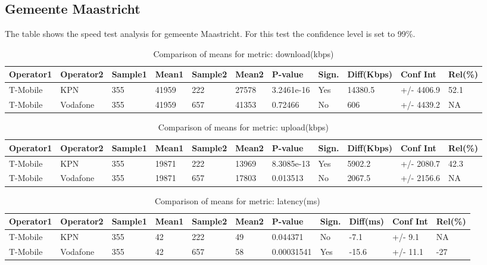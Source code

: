 \documentclass[]{article}
\begin{document}
\normalsize

\newpage

\subsection{Gemeente Maastricht}\label{gemeente-maastricht}

The table shows the speed test analysis for gemeente Maastricht. For
this test the confidence level is set to 99\%.

\begin{table}[ht]
\centering
{\footnotesize
\begin{tabular}{lllllllllll}
  \hline
Operator1 & Operator2 & Sample1 & Mean1 & Sample2 & Mean2 & P-value & Sign. & Diff(Kbps) & Conf Int & Rel(\%) \\ 
  \hline
T-Mobile & KPN & 355 & 41959 & 222 & 27578 & 3.2461e-16 & Yes & 14380.5 & +/- 4406.9 & 52.1 \\ 
  T-Mobile & Vodafone & 355 & 41959 & 657 & 41353 & 0.72466 & No & 606 & +/- 4439.2 & NA \\ 
   \hline
\end{tabular}
}
\caption{Comparison of means for metric: download(kbps)} 
\end{table}\begin{table}[ht]
\centering
{\footnotesize
\begin{tabular}{lllllllllll}
  \hline
Operator1 & Operator2 & Sample1 & Mean1 & Sample2 & Mean2 & P-value & Sign. & Diff(Kbps) & Conf Int & Rel(\%) \\ 
  \hline
T-Mobile & KPN & 355 & 19871 & 222 & 13969 & 8.3085e-13 & Yes & 5902.2 & +/- 2080.7 & 42.3 \\ 
  T-Mobile & Vodafone & 355 & 19871 & 657 & 17803 & 0.013513 & No & 2067.5 & +/- 2156.6 & NA \\ 
   \hline
\end{tabular}
}
\caption{Comparison of means for metric: upload(kbps)} 
\end{table}\begin{table}[ht]
\centering
{\footnotesize
\begin{tabular}{lllllllllll}
  \hline
Operator1 & Operator2 & Sample1 & Mean1 & Sample2 & Mean2 & P-value & Sign. & Diff(ms) & Conf Int & Rel(\%) \\ 
  \hline
T-Mobile & KPN & 355 & 42 & 222 & 49 & 0.044371 & No & -7.1 & +/- 9.1 & NA \\ 
  T-Mobile & Vodafone & 355 & 42 & 657 & 58 & 0.00031541 & Yes & -15.6 & +/- 11.1 & -27 \\ 
   \hline
\end{tabular}
}
\caption{Comparison of means for metric: latency(ms)} 
\end{table}
\end{document}
